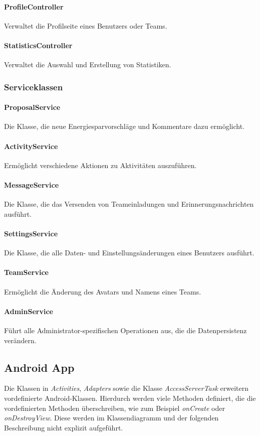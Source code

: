	\paragraph{ProfileController}Verwaltet die Profilseite eines Benutzers oder Teams.
	\paragraph{StatisticsController}Verwaltet die Auswahl und Erstellung von Statistiken.

\subsubsection{Serviceklassen}
	\paragraph{ProposalService}Die Klasse, die neue Energiesparvorschl\"age und Kommentare dazu erm\"oglicht.
	\paragraph{ActivityService}Erm\"oglicht verschiedene Aktionen zu Aktivit\"aten auszuf\"uhren.
	\paragraph{MessageService}Die Klasse, die das Versenden von Teameinladungen und Erinnerungsnachrichten ausf\"uhrt.
	\paragraph{SettingsService}Die Klasse, die alle Daten- und Einstellungs\"anderungen eines Benutzers ausf\"uhrt.
	\paragraph{TeamService}Erm\"oglicht die \"Anderung des Avatars und Namens eines Teams.
	\paragraph{AdminService}F\"uhrt alle Administrator-spezifischen Operationen aus, die die Datenpersistenz ver\"andern.

\subsection{Android App}
Die Klassen in \emph{Activities}, \emph{Adapters} sowie die Klasse \emph{AccessServerTask} erweitern vordefinierte Android-Klassen. Hierdurch werden viele Methoden definiert, die die vordefinierten Methoden überschreiben, wie zum Beispiel \emph{onCreate} oder \emph{onDestroyView}. Diese werden im Klassendiagramm und der folgenden Beschreibung nicht explizit aufgeführt.
